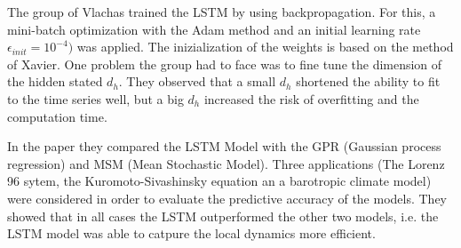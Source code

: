 	The group of Vlachas trained the LSTM by using backpropagation. For this, a mini-batch optimization with the Adam method \cite{Adam} and an initial learning rate $\epsilon_{init}=10^{-4})$ was applied. The inizialization of the weights is based on the method of Xavier. One problem the group had to face was to fine tune the dimension of the hidden stated $d_h$. They observed that a small $d_h$ shortened the ability to fit to the time series well, but a big $d_h$ increased the risk of overfitting and the computation time.
	
	In the paper they compared the LSTM Model with the GPR (Gaussian process regression) and MSM (Mean Stochastic Model). Three applications (The Lorenz 96 sytem, the Kuromoto-Sivashinsky equation an a barotropic climate model) were considered in order to evaluate the predictive accuracy of the models. They showed that in all cases the LSTM outperformed the other two models, i.e. the LSTM model was able to catpure the local dynamics more efficient.